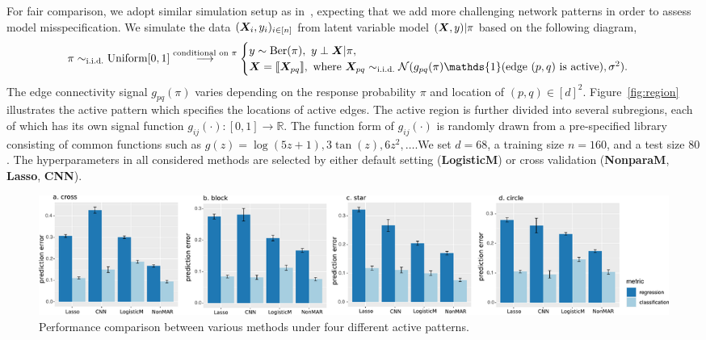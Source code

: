 \documentclass[11pt]{article}
\theoremstyle{definition}
\begin{document}
For fair comparison, we adopt similar simulation setup as in~\cite{relion2019network}, expecting that we add more challenging network patterns in order to assess model misspecification. We simulate the data $(\bm X_i, y_i)_{i\in[n]}$ from latent variable model $(\bm X,y)|\pi$ based on the following diagram,
\[
\pi \sim_{\text{i.i.d.}} \text{Uniform}[0,1] \stackrel{\text{conditional on $\pi$}}{\longrightarrow}
\begin{cases}
y\sim \text{Ber}(\pi),\ \text{}y\perp \mX|\pi, \\
\mX=\entry{\mX_{pq}}, \ \text{where\ } \mX_{pq}\sim_{\text{i.i.d.}} \tN(g_{pq}(\pi)\mathds{1}(\text{edge $(p,q)$ is active}), \sigma^2).
\end{cases}
\]
The edge connectivity signal $g_{pq}(\pi)$ varies depending on the response probability $\pi$ and location of $(p,q)\in[d]^2$. Figure~\ref{fig:region} illustrates the active pattern which specifies the locations of active edges. The active region is further divided into several subregions, each of which has its own signal function $g_{ij}(\cdot)\colon [0,1]\to \mathbb{R}$. The function form of $g_{ij}(\cdot)$ is randomly drawn from a pre-specified library consisting of common functions such as $g(z)=\log(5z+1), 3\tan(z),6z^2,\ldots$.We set $d=68$, a training size $n=160$, and a test size $80$. The hyperparameters in all considered methods are selected by either default setting ({\bf \small LogisticM}) or cross validation ({\bf \small NonparaM}, {\bf \small Lasso}, {\small \bf CNN}). 


\begin{figure}[ht]
    \centering
    \includegraphics[width=\textwidth]{error_tot_comb2.pdf}
    \caption{Performance comparison between various methods under four different active patterns. }\label{fig:compare}
    \vspace{-.2cm}
\end{figure}
\end{document}
